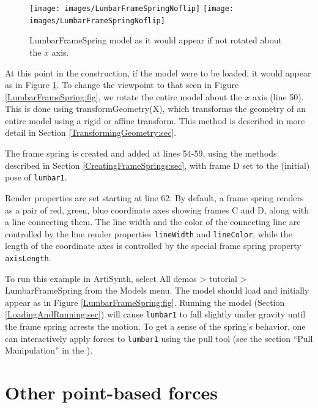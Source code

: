 \begin{figure}[ht]
\begin{center}
\iflatexml
 \texttt{[image: images/LumbarFrameSpringNoflip]}
\else
 \texttt{[image: images/LumbarFrameSpringNoflip]}
\fi
\end{center}
\caption{LumbarFrameSpring model as it would appear if not rotated
about the $x$ axis.}
\label{LumbarFrameSpringNoflip:fig}
\end{figure}

At this point in the construction, if the model were to be loaded, it
would appear as in Figure \ref{LumbarFrameSpringNoflip:fig}. To change
the viewpoint to that seen in Figure \ref{LumbarFrameSpring:fig}, we
rotate the entire model about the $x$ axis (line 50).  This is done
using
{transformGeometry(X)}, which transforms the geometry of an entire
model using a rigid or affine transform. This method is
described in more detail in Section \ref{TransformingGeometry:sec}.

The frame spring is created and added at lines 54-59, using the
methods described in Section \ref{CreatingFrameSprings:sec}, with
frame D set to the (initial) pose of {\tt lumbar1}.

Render properties are set starting at line 62. By default, a frame
spring renders as a pair of red, green, blue coordinate axes showing
frames C and D, along with a line connecting them. The line width and
the color of the connecting line are controlled by the line render
properties {\tt lineWidth} and {\tt lineColor}, while the length of
the coordinate axes is controlled by the special frame spring property
{\tt axisLength}.

To run this example in ArtiSynth, select {\sf All demos > tutorial >
LumbarFrameSpring} from the {\sf Models} menu. The model should load
and initially appear as in Figure \ref{LumbarFrameSpring:fig}.
Running the model (Section \ref{LoadingAndRunning:sec}) will cause
{\tt lumbar1} to fall slightly under gravity until the frame spring
arrests the motion. To get a sense of the spring's behavior, one can
interactively apply forces to {\tt lumbar1} using the pull tool
(see the section ``Pull Manipulation'' in the
).

\section{Other point-based forces}
\label{OtherPointForces:sec}

